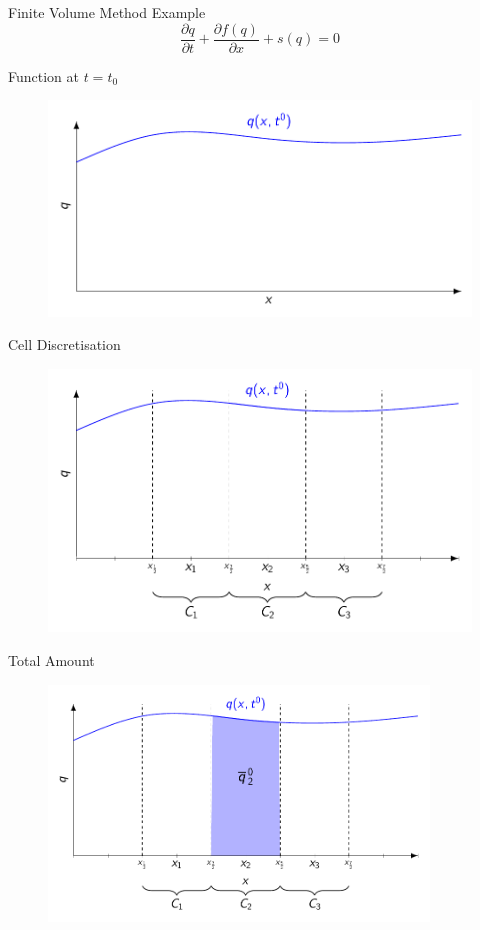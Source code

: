 \documentclass[handout]{beamer}
\begin{document}
\begin{frame}{Finite Volume Method Example}
	\begin{equation*}
	\frac{\partial q}{\partial t} + \frac{\partial f(q)}{\partial x} + s(q) = 0
	\end{equation*}	
\end{frame}
\begin{frame}{Function at $t=t_0$}
	\begin{figure}
		\includegraphics[width=\textwidth]{./Pics/FVMpicture/Function.pdf}
	\end{figure}
\end{frame}
\begin{frame}{Cell Discretisation}
	\begin{figure}
		\includegraphics[width=\textwidth]{./Pics/FVMpicture/Cells.pdf}
	\end{figure}
\end{frame}
\begin{frame}{Total Amount}
	\begin{figure}
		\includegraphics[width=0.9\textwidth]{./Pics/FVMpicture/Total.pdf}
	\end{figure}
\end{frame}
\end{document}
